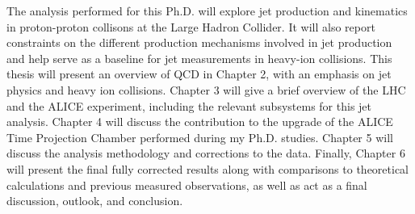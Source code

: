 \par
The analysis performed for this Ph.D. will explore jet production and kinematics in proton-proton collisons at the Large Hadron Collider.  It will also report constraints on the different production mechanisms involved in jet production and help serve as a baseline for jet measurements in heavy-ion collisions.
This thesis will present an overview of QCD in Chapter 2, with an emphasis on jet physics and heavy ion collisions.  Chapter 3 will give a brief overview of the LHC and the ALICE experiment, including the relevant subsystems for this jet analysis.  Chapter 4 will discuss the contribution to the upgrade of the ALICE Time Projection Chamber performed during my Ph.D. studies.  Chapter 5 will discuss the analysis methodology and corrections to the data.  Finally, Chapter 6 will present the final fully corrected results along with comparisons to theoretical calculations and previous measured observations, as well as act as a final discussion, outlook, and conclusion. 
